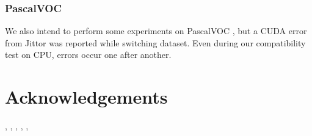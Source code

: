 \documentclass[a4paper]{article}
\begin{document}
\subsubsection{PascalVOC}
We also intend to perform some experiments on PascalVOC \cite{voc1,voc2}, but a CUDA error from Jittor \cite{jittor} was reported while switching dataset. Even during our compatibility test on CPU, errors occur one after another.

\section{Acknowledgements}

\cite{pca-ipca}, \cite{cie}, \cite{voc1}, \cite{voc2}, \cite{willow}, \cite{vgg}

\newpage 


\end{document}
